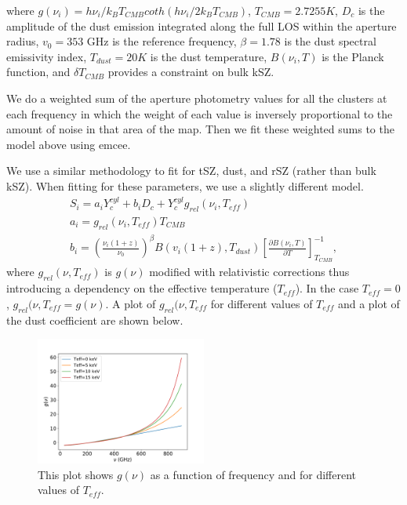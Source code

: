 \documentclass{princeton_astro_thesis}
\begin{document}
where $g(\nu_i)=h\nu_i/k_B T_{CMB} coth(h\nu_i/2k_B T_{CMB})$, $T_{CMB}=2.7255 K$, $D_c$ is the amplitude of the dust emission integrated along the full LOS within the aperture radius, $v_0=353$ GHz is the reference frequency, $\beta=1.78$ is the dust spectral emissivity index, $T_{dust}= 20 K$ is the dust temperature, $B(\nu_i,T)$ is the Planck function, and $\delta T_{CMB}$ provides a constraint on bulk kSZ.\par 
We do a weighted sum of the aperture photometry values for all the clusters at each frequency in which the weight of each value is inversely proportional to the amount of noise in that area of the map. Then we fit these weighted sums to the model above using emcee.
\par We use a similar methodology to fit for tSZ, dust, and rSZ (rather than bulk kSZ). When fitting for these parameters, we use a slightly different model.
\begin{equation}
\begin{aligned}
S_i=a_i Y^{cyl}_{c}+b_i D_c +Y^{cyl}_{c}g_{rel}(\nu_i,T_{eff}) \\
a_i=g_{rel}(\nu_i,T_{eff}) T_{CMB}\\
b_i=\left(\frac{\nu_i(1+z)}{\nu_0}\right)^\beta B (v_i(1+z),T_{dust})\left[\frac{\partial B(\nu_i,T)}{\partial T} \right]^{-1}_{T_{CMB}},
\end{aligned}
\end{equation}
where $g_{rel}(\nu,T_{eff})$ is $g(\nu)$ modified with relativistic corrections thus introducing a dependency on the effective temperature ($T_{eff}$). In the case $T_{eff}=0$, $g_{rel}(\nu,T_{eff}=g(\nu)$. A plot of $g_{rel}(\nu,T_{eff}$ for different values of $T_{eff}$ and a plot of the dust coefficient are shown below.

\begin{figure}[h]
\centering
\includegraphics[width=0.5\textwidth]{../gnu.pdf}
\caption{This plot shows $g(\nu)$ as a function of frequency and for different values of $T_{eff}$. }
\end{figure}
\end{document}
